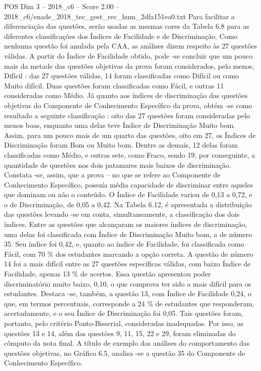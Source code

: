 \begin{textsample}{POS Dim 3 – 2018\_c6 – Score 2.00 – 2018\_c6/enade\_2018\_tec\_gest\_rec\_hum\_2dfa151ea0.txt}
Para facilitar a diferenciação das questões, serão usadas as mesmas cores da Tabela 6.8 para as diferentes classificações dos Índices de Facilidade e de Discriminação.
Como nenhuma questão foi anulada pela CAA, as análises dizem respeito às 27 questões válidas.
A partir do Índice de Facilidade obtido, pode -se concluir que um pouco mais da metade das questões objetivas da prova foram considerados, pelo menos, Difícil : das 27 questões válidas, 14 foram classificadas como Difícil ou como Muito difícil.
Duas questões foram classificadas como Fácil, e outras 11 consideradas como Médio.
Já quanto aos índices de discriminação das questões objetivas do Componente de Conhecimento Específico da prova, obtém -se como resultado a seguinte classificação : oito das 27 questões foram consideradas pelo menos boas, enquanto uma delas teve Índice de Discriminação Muito bom.
Assim, para um pouco mais de um quarto das questões, oito em 27, os Índices de Discriminação foram Bom ou Muito bom.
Dentre as demais, 12 delas foram classificadas como Médio, e outras sete, como Fraco, sendo 19, por conseguinte, a quantidade de questões nos dois patamares mais baixos de discriminação.
Constata -se, assim, que a prova – no que se refere ao Componente de Conhecimento Específico, possuía média capacidade de discriminar entre aqueles que dominam ou não o conteúdo.
O Índice de Facilidade variou de 0,13 a 0,72, e o de Discriminação, de 0,05 a 0,42.
Na Tabela 6.12, é apresentada a distribuição das questões levando -se em conta, simultaneamente, a classificação dos dois índices.
Entre as questões que alcançaram os maiores índices de discriminação, uma delas foi classificada com Índice de Discriminação Muito bom, a de número 35.
Seu índice foi 0,42, e, quanto ao índice de Facilidade, foi classificada como Fácil, com 70 \% dos estudantes marcando a opção correta.
A questão de número 14 foi a mais difícil entre as 27 questões específicas válidas, com baixo Índice de Facilidade, apenas 13 \% de acertos.
Essa questão apresentou poder discriminatório muito baixo, 0,10, o que comprova ter sido a mais difícil para os estudantes.
Destaca -se, também, a questão 13, com Índice de Facilidade 0,24, o que, em termos percentuais, corresponde a 24 \% de estudantes que responderam, acertadamente, e o seu Índice de Discriminação foi 0,05.
Tais questões foram, portanto, pelo critério Ponto-Bisserial, consideradas inadequadas.
Por isso, as questões 13 e 14, além das questões 9, 11, 15, 22 e 29, foram eliminadas do cômputo da nota final.
A título de exemplo das análises do comportamento das questões objetivas, no Gráfico 6.5, analisa -se a questão 35 do Componente de Conhecimento Específico.

\end{textsample}
